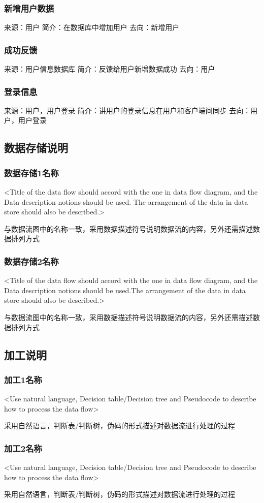 \subsubsection{新增用户数据}
来源：用户
简介：在数据库中增加用户
去向：新增用户

\subsubsection{成功反馈}
来源：用户信息数据库
简介：反馈给用户新增数据成功
去向：用户

\subsubsection{登录信息}
来源：用户，用户登录
简介：讲用户的登录信息在用户和客户端间同步
去向：用户，用户登录


\subsection{数据存储说明}
\subsubsection{数据存储1名称}
<Title of  the data flow should accord with the one in data flow diagram, and the Data description notions should be used. The arrangement of the data in data store should also be described.>

与数据流图中的名称一致，采用数据描述符号说明数据流的内容，另外还需描述数据排列方式

\subsubsection{数据存储2名称}
<Title of  the data flow should accord with the one in data flow diagram, and the Data description notions should be used.The arrangement of the data in data store should also be described.>

与数据流图中的名称一致，采用数据描述符号说明数据流的内容，另外还需描述数据排列方式

\subsection{加工说明}
\subsubsection{加工1名称}
<Use natural language, Decision table/Decision tree and Pseudocode to describe how to process the data flow>

采用自然语言，判断表/判断树，伪码的形式描述对数据流进行处理的过程

\subsubsection{加工2名称}
<Use natural language, Decision table/Decision tree and Pseudocode to describe how to process the data flow>

采用自然语言，判断表/判断树，伪码的形式描述对数据流进行处理的过程
